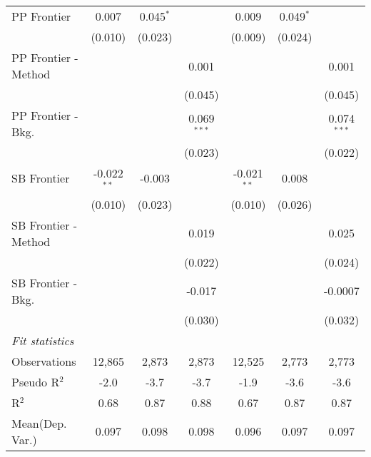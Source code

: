 \begin{tabular}{lcccccc}
   PP Frontier          & 0.007         & 0.045$^{*}$ &               & 0.009         & 0.049$^{*}$ &   \\   
                        & (0.010)       & (0.023)     &               & (0.009)       & (0.024)     &   \\   
   PP Frontier - Method &               &             & 0.001         &               &             & 0.001\\   
                        &               &             & (0.045)       &               &             & (0.045)\\   
   PP Frontier - Bkg.   &               &             & 0.069$^{***}$ &               &             & 0.074$^{***}$\\   
                        &               &             & (0.023)       &               &             & (0.022)\\   
   SB Frontier          & -0.022$^{**}$ & -0.003      &               & -0.021$^{**}$ & 0.008       &   \\   
                        & (0.010)       & (0.023)     &               & (0.010)       & (0.026)     &   \\   
   SB Frontier - Method &               &             & 0.019         &               &             & 0.025\\   
                        &               &             & (0.022)       &               &             & (0.024)\\   
   SB Frontier - Bkg.   &               &             & -0.017        &               &             & -0.0007\\   
                        &               &             & (0.030)       &               &             & (0.032)\\   
   \midrule
   \emph{Fit statistics}\\
   Observations         & 12,865        & 2,873       & 2,873         & 12,525        & 2,773       & 2,773\\  
   Pseudo R$^2$         & -2.0          & -3.7        & -3.7          & -1.9          & -3.6        & -3.6\\  
   R$^2$                & 0.68          & 0.87        & 0.88          & 0.67          & 0.87        & 0.87\\  
Mean(Dep. Var.) & 0.097 & 0.098 & 0.098 & 0.096 & 0.097 & 0.097 \\
   

\end{tabular}
